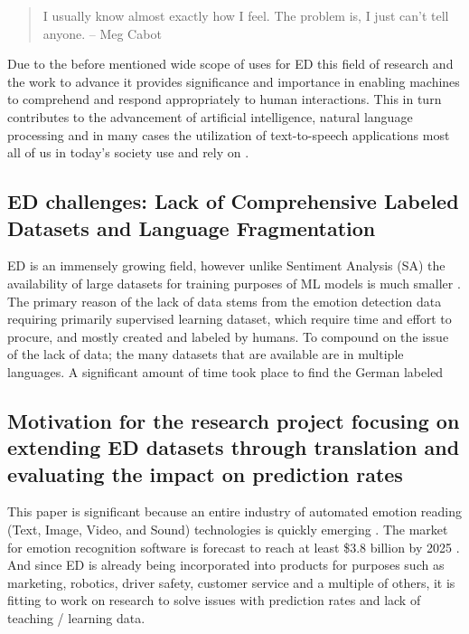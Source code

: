 \documentclass[11pt]{article}
\begin{document}
\begin{quote}
    I usually know almost exactly how I feel. The problem is, I just can’t tell anyone.
    \flushright -- Meg Cabot
\end{quote}

Due to the before mentioned wide scope of uses for ED this field of research and the work to advance it provides significance and importance in enabling machines to comprehend and respond appropriately to human interactions. This in turn contributes to the advancement of artificial intelligence, natural language processing and in many cases the utilization of text-to-speech applications most all of us in today's society use and rely on \cite{ai-framework-detection-emotions}.

\subsection{ED challenges: Lack of Comprehensive Labeled Datasets and Language Fragmentation}
ED is an immensely growing field, however unlike Sentiment Analysis (SA) the availability of large datasets for training purposes of ML models is much smaller \cite{ACLU-ED-Data, ai-framework-detection-emotions}. The primary reason of the lack of data stems from the emotion detection data requiring primarily supervised learning dataset, which require time and effort to procure, and mostly created and labeled by humans. To compound on the issue of the lack of data; the many datasets that are available are in multiple languages. A significant amount of time took place to find the German labeled 

\subsection{Motivation for the research project focusing on extending ED datasets through translation and evaluating the impact on prediction rates}

This paper is significant because an entire industry of automated emotion reading (Text, Image, Video, and Sound) technologies is quickly emerging \cite{ACLU-ED-Data, ACLU-THE-DAWN-OF-ROBOT-SURVEILLANCE}. The market for emotion recognition software is forecast to reach at least \$3.8 billion by 2025 \cite{ACLU-ED-Data, ACLU-THE-DAWN-OF-ROBOT-SURVEILLANCE}. And since ED is already being incorporated into products for purposes such as marketing, robotics, driver safety, customer service and a multiple of others, it is fitting to work on research to solve issues with prediction rates and lack of teaching / learning data.
\end{document}

